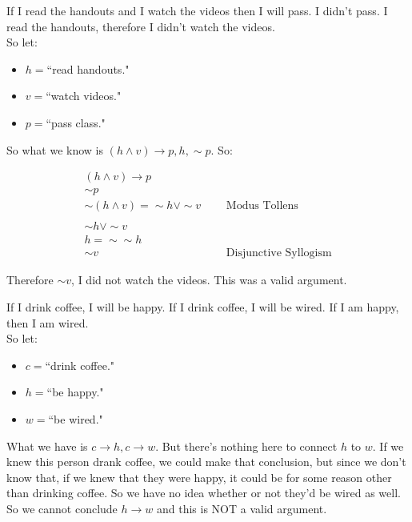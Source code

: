 \begin{example}
If I read the handouts and I watch the videos  then I will pass.  I didn't pass. I read the handouts, therefore I didn't watch the videos.\\

So let:

\begin{itemize}
\item $h=$``read handouts."
\item $v=$``watch videos."
\item $p=$``pass class."
\end{itemize}

So what we know is $(h\wedge v)\to p, h, \sim p.$  So:

$$\begin{array}{lcl}
(h\wedge v)\to p&\ \ \ &\\
\sim p\\
\hline
\sim(h\wedge v)=\sim h \vee\sim v & &\text{Modus Tollens}\\
 \\
\sim h \vee \sim v \\
h=\sim \sim h\\
\hline
\sim v  & &\text{Disjunctive Syllogism}
\end{array}$$

Therefore $\sim v$, I did not watch the videos.  This was a valid argument.


\end{example}


\begin{example}
If I drink coffee, I will be happy.  If I drink coffee, I will be wired.  If I am happy, then I am wired.\\

So let:

\begin{itemize}
\item $c=$``drink coffee."
\item $h=$``be happy."
\item $w=$``be wired."
\end{itemize}

What we have is $c\to h, c\to w$.  But there's nothing here to connect $h$ to $w$.  If we knew this person drank coffee, we could make that conclusion, but since we don't know that, if we knew that they were happy, it could be for some reason other than drinking coffee.  So we have no idea whether or not they'd be wired as well.  So we cannot conclude $h \to w$ and this is NOT a valid argument.


\end{example}










